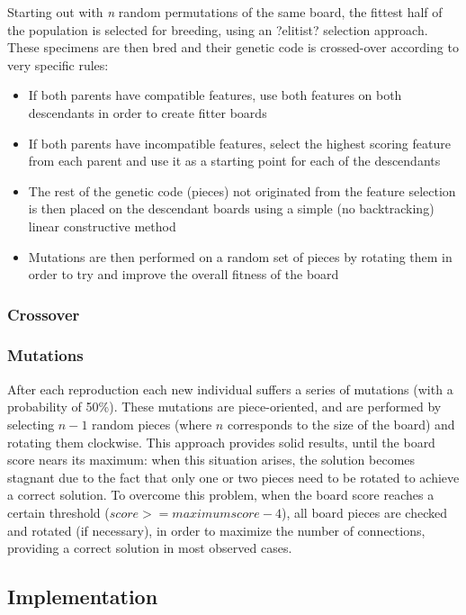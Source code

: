 \documentclass{llncs}
\begin{document}
Starting out with \textit{n} random permutations of the same board, the fittest half of the population is selected for breeding, using an ?elitist? selection approach. These specimens are then bred and their genetic code is crossed-over according to very specific rules:

\begin{itemize}
	\item If both parents have compatible features, use both features on both descendants in order to create fitter boards
	\item If both parents have incompatible features, select the highest scoring feature from each parent and use it as a starting point for each of the descendants
	\item The rest of the genetic code (pieces) not originated from the feature selection is then placed on the descendant boards using a simple (no backtracking) linear constructive method
	\item Mutations are then performed on a random set of pieces by rotating them in order to try and improve the overall fitness of the board
\end{itemize}

\subsubsection{Crossover}\label{sec:crossover}

\subsubsection{Mutations}\label{sec:mutations}

After each reproduction each new individual suffers a series of mutations (with a probability of 50\%). These mutations are piece-oriented, and are performed by selecting $n-1$ random pieces (where $n$ corresponds to the size of the board) and rotating them clockwise. This approach provides solid results, until the board score nears its maximum: when this situation arises, the solution becomes stagnant due to the fact that only one or two pieces need to be rotated to achieve a correct solution. To overcome this problem, when the board score reaches a certain threshold ($score >= maximum score - 4$), all board pieces are checked and rotated (if necessary), in order to maximize the number of connections, providing a correct solution in most observed cases.

\subsection{Implementation}\label{sec:implementation}
\end{document}
